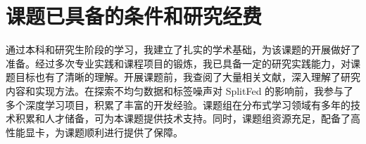 \chapter{课题已具备的条件和研究经费}

通过本科和研究生阶段的学习，我建立了扎实的学术基础，为该课题的开展做好了准备。经过多次专业实践和课程项目的锻炼，我已具备一定的研究实践能力，对课题目标也有了清晰的理解。开展课题前，我查阅了大量相关文献，深入理解了研究内容和实现方法。在探索不均匀数据和标签噪声对 SplitFed 的影响前，我参与了多个深度学习项目，积累了丰富的开发经验。课题组在分布式学习领域有多年的技术积累和人才储备，可为本课题提供技术支持。同时，课题组资源充足，配备了高性能显卡，为课题顺利进行提供了保障。